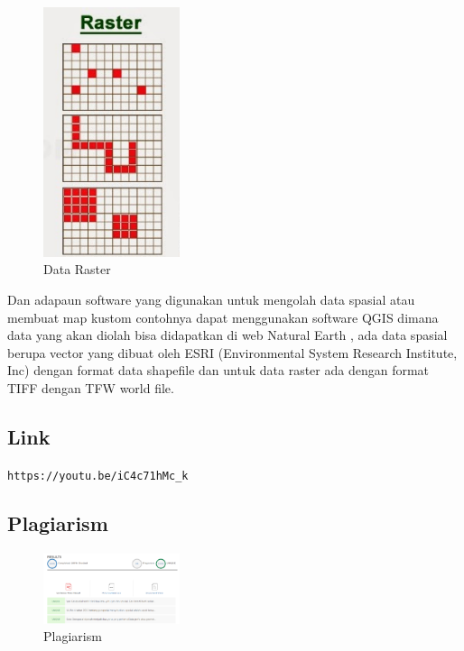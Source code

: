 \begin{itemize}
\begin{enumerate}
	\begin{figure}[H]
	\includegraphics[width=4cm]{figures/Tugas1/1174087/raster.png}
	\centering
	\caption{Data Raster}
	\end{figure}
	\end{enumerate}
	
Dan adapaun software yang digunakan untuk mengolah data spasial atau membuat map kustom contohnya dapat menggunakan software QGIS dimana data yang akan diolah bisa didapatkan di web Natural Earth , ada data spasial berupa vector yang dibuat oleh ESRI (Environmental System Research Institute, Inc) dengan format data shapefile dan untuk data raster ada dengan format TIFF dengan TFW world file.
	
\end{itemize}

\subsection{Link}
\verb|https://youtu.be/iC4c71hMc_k|

\subsection{Plagiarism}
\begin{figure}[H]
	\includegraphics[width=4cm]{figures/Tugas1/1174087/plagiarism.png}
	\centering
	\caption{Plagiarism}
	\end{figure}